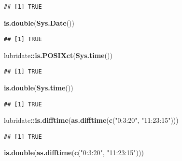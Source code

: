 \documentclass[]{book}
\newenvironment{Shaded}{\begin{snugshade}}{\end{snugshade}}
\newcommand{\KeywordTok}[1]{\textcolor[rgb]{0.13,0.29,0.53}{\textbf{#1}}}
\newcommand{\NormalTok}[1]{#1}
\newcommand{\OperatorTok}[1]{\textcolor[rgb]{0.81,0.36,0.00}{\textbf{#1}}}
\newcommand{\StringTok}[1]{\textcolor[rgb]{0.31,0.60,0.02}{#1}}
\begin{document}
\begin{verbatim}
## [1] TRUE
\end{verbatim}

\begin{Shaded}
\begin{Highlighting}[]
\KeywordTok{is.double}\NormalTok{(}\KeywordTok{Sys.Date}\NormalTok{())}
\end{Highlighting}
\end{Shaded}

\begin{verbatim}
## [1] TRUE
\end{verbatim}

\begin{Shaded}
\begin{Highlighting}[]
\NormalTok{lubridate}\OperatorTok{::}\KeywordTok{is.POSIXct}\NormalTok{(}\KeywordTok{Sys.time}\NormalTok{())}
\end{Highlighting}
\end{Shaded}

\begin{verbatim}
## [1] TRUE
\end{verbatim}

\begin{Shaded}
\begin{Highlighting}[]
\KeywordTok{is.double}\NormalTok{(}\KeywordTok{Sys.time}\NormalTok{())}
\end{Highlighting}
\end{Shaded}

\begin{verbatim}
## [1] TRUE
\end{verbatim}

\begin{Shaded}
\begin{Highlighting}[]
\NormalTok{lubridate}\OperatorTok{::}\KeywordTok{is.difftime}\NormalTok{(}\KeywordTok{as.difftime}\NormalTok{(}\KeywordTok{c}\NormalTok{(}\StringTok{"0:3:20"}\NormalTok{, }\StringTok{"11:23:15"}\NormalTok{)))}
\end{Highlighting}
\end{Shaded}

\begin{verbatim}
## [1] TRUE
\end{verbatim}

\begin{Shaded}
\begin{Highlighting}[]
\KeywordTok{is.double}\NormalTok{(}\KeywordTok{as.difftime}\NormalTok{(}\KeywordTok{c}\NormalTok{(}\StringTok{"0:3:20"}\NormalTok{, }\StringTok{"11:23:15"}\NormalTok{)))}
\end{Highlighting}
\end{Shaded}
\end{document}

